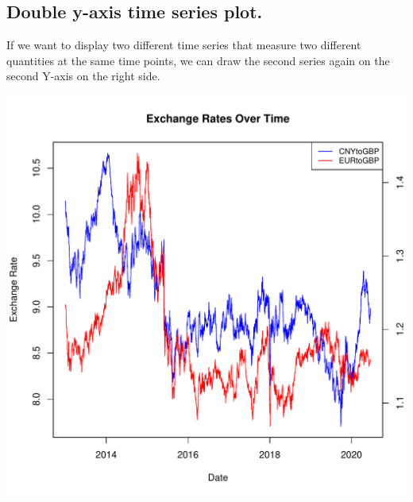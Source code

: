 \documentclass{article}\usepackage[]{graphicx}\usepackage[]{xcolor}
\makeatletter
\def\maxwidth{ %
  \ifdim\Gin@nat@width>\linewidth
    \linewidth
  \else
    \Gin@nat@width
  \fi
}
\newenvironment{knitrout}{}{} %
\makeatother
\begin{document}
\subsection{Double y-axis time series plot.}

If we want to display two different time series that measure two different quantities at the same time points, we can draw the second series again on the second Y-axis on the right side.

\begin{knitrout}
\color{fgcolor}
\includegraphics[width=\maxwidth]{figure/unnamed-chunk-6-1} 
\end{knitrout}
\end{document}
